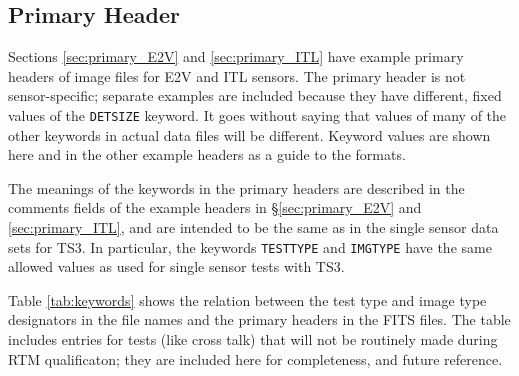 \documentclass{article}[12pt]
\begin{document}
{\subsection{Primary Header}
Sections \ref{sec:primary_E2V} and \ref{sec:primary_ITL}  have example primary headers of image files for E2V and ITL sensors. The primary header is not sensor-specific; separate examples are included because they have different, fixed values of the {\tt DETSIZE} keyword.  It goes without saying that values of many of the other keywords in actual data files will be different.  Keyword values are shown here and in the other example headers as a guide to the formats.

The meanings of the keywords in the primary headers are described in the comments fields of the example headers in \S \ref{sec:primary_E2V} and \ref{sec:primary_ITL}, and are intended to be the same as in the single sensor data sets for TS3.  In particular, the keywords {\tt TESTTYPE} and {\tt IMGTYPE} have the same allowed values as used for single sensor tests with TS3.

Table \ref{tab:keywords} shows the relation between the test type and image type designators in the file names and the primary headers in the FITS files.  The table includes entries for tests (like cross talk) that will not be routinely made during RTM qualificaton; they are included here for completeness, and future reference.


}
\end{document}
